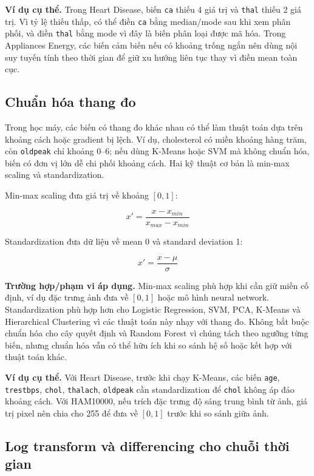 \textbf{Ví dụ cụ thể.} Trong Heart Disease, biến \texttt{ca} thiếu 4 giá trị và \texttt{thal} thiếu 2 giá trị. Vì tỷ lệ thiếu thấp, có thể điền \texttt{ca} bằng median/mode sau khi xem phân phối, và điền \texttt{thal} bằng mode vì đây là biến phân loại được mã hóa. Trong Appliances Energy, các biến cảm biến nếu có khoảng trống ngắn nên dùng nội suy tuyến tính theo thời gian để giữ xu hướng liên tục thay vì điền mean toàn cục.

\subsection{Chuẩn hóa thang đo}

Trong học máy, các biến có thang đo khác nhau có thể làm thuật toán dựa trên khoảng cách hoặc gradient bị lệch. Ví dụ, cholesterol có miền khoảng hàng trăm, còn \texttt{oldpeak} chỉ khoảng 0--6; nếu dùng K-Means hoặc SVM mà không chuẩn hóa, biến có đơn vị lớn dễ chi phối khoảng cách. Hai kỹ thuật cơ bản là min-max scaling và standardization.

Min-max scaling đưa giá trị về khoảng $[0,1]$:

\begin{equation}
x' = \frac{x - x_{min}}{x_{max} - x_{min}}
\end{equation}

Standardization đưa dữ liệu về mean 0 và standard deviation 1:

\begin{equation}
x' = \frac{x - \mu}{\sigma}
\end{equation}

\textbf{Trường hợp/phạm vi áp dụng.} Min-max scaling phù hợp khi cần giữ miền cố định, ví dụ đặc trưng ảnh đưa về $[0,1]$ hoặc mô hình neural network. Standardization phù hợp hơn cho Logistic Regression, SVM, PCA, K-Means và Hierarchical Clustering vì các thuật toán này nhạy với thang đo. Không bắt buộc chuẩn hóa cho cây quyết định và Random Forest vì chúng tách theo ngưỡng từng biến, nhưng chuẩn hóa vẫn có thể hữu ích khi so sánh hệ số hoặc kết hợp với thuật toán khác.

\textbf{Ví dụ cụ thể.} Với Heart Disease, trước khi chạy K-Means, các biến \texttt{age}, \texttt{trestbps}, \texttt{chol}, \texttt{thalach}, \texttt{oldpeak} cần standardization để \texttt{chol} không áp đảo khoảng cách. Với HAM10000, nếu trích đặc trưng độ sáng trung bình từ ảnh, giá trị pixel nên chia cho 255 để đưa về $[0,1]$ trước khi so sánh giữa ảnh.

\subsection{Log transform và differencing cho chuỗi thời gian}
\label{sec:logtransform}


